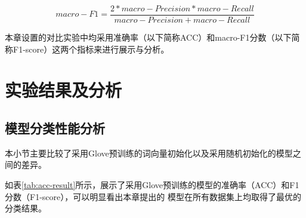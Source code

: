 \begin{equation}\label{mf1}
    macro-F1=\frac{2*macro-Precision * macro-Recall}{macro-Precision + macro-Recall}
\end{equation}

本章设置的对比实验中均采用准确率（以下简称ACC）和macro-F1分数（以下简称F1-score）这两个指标来进行展示与分析。
\section{实验结果及分析}
\subsection{模型分类性能分析}
本小节主要比较了采用Glove预训练的词向量初始化以及采用随机初始化的模型之间的差异。

如表\ref{tab:acc-result}所示，展示了采用Glove预训练的模型的准确率（ACC）和F1分数（F1-score），可以明显看出本章提出的
模型在所有数据集上均取得了最优的分类结果。

